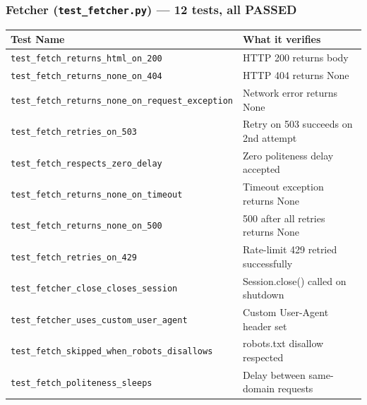 \documentclass[12pt]{article}
\begin{document}
\subsubsection*{Fetcher (\texttt{test\_fetcher.py}) --- 12 tests, all PASSED}
\begin{table}[H]
\centering
\footnotesize
\begin{tabular}{|p{7cm}|p{7.5cm}|}
\hline
\textbf{Test Name} & \textbf{What it verifies} \\
\hline
\texttt{test\_fetch\_returns\_html\_on\_200}             & HTTP 200 returns body \\
\texttt{test\_fetch\_returns\_none\_on\_404}             & HTTP 404 returns None \\
\texttt{test\_fetch\_returns\_none\_on\_request\_exception} & Network error returns None \\
\texttt{test\_fetch\_retries\_on\_503}                   & Retry on 503 succeeds on 2nd attempt \\
\texttt{test\_fetch\_respects\_zero\_delay}              & Zero politeness delay accepted \\
\texttt{test\_fetch\_returns\_none\_on\_timeout}         & Timeout exception returns None \\
\texttt{test\_fetch\_returns\_none\_on\_500}             & 500 after all retries returns None \\
\texttt{test\_fetch\_retries\_on\_429}                   & Rate-limit 429 retried successfully \\
\texttt{test\_fetcher\_close\_closes\_session}           & Session.close() called on shutdown \\
\texttt{test\_fetcher\_uses\_custom\_user\_agent}        & Custom User-Agent header set \\
\texttt{test\_fetch\_skipped\_when\_robots\_disallows}   & robots.txt disallow respected \\
\texttt{test\_fetch\_politeness\_sleeps}                 & Delay between same-domain requests \\
\hline
\end{tabular}
\end{table}
\end{document}
